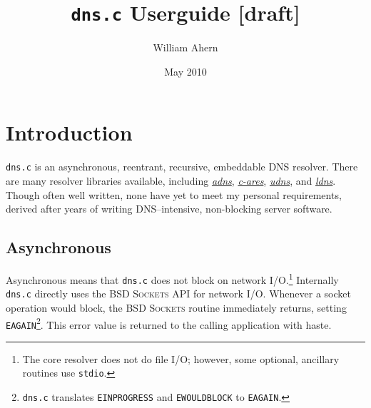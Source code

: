 \documentclass[11pt]{article}
\begin{document}
%
%
\newcommand*{\dnsc}[0]{\texttt{dns.c}\xspace}
\newcommand*{\lref}[1]{\hyperref[#1]{#1}\index{#1}}
\newcommand*{\dn}[1]{\texttt{#1}\xspace}

\newenvironment{todo}[1]{
	\begin{color}{red}
	\sf
	\begin{tabular}{|p{0.9\textwidth}|}
	\hline
	TODO---\uppercase{#1} \\\hline
	\index{TODO!\lowercase{#1}}
}{
	\\\hline
	\end{tabular}
	\end{color}
}

%
%
\title{\dnsc Userguide [draft]}
\date{May 2010}
\author{William Ahern}
\maketitle

\tableofcontents


\clearpage

\setcounter{page}{1}


\section{Introduction}

\dnsc is an asynchronous, reentrant, recursive, embeddable DNS resolver.
There are many resolver libraries available, including
\href{http://www.chiark.greenend.org.uk/~ian/adns/}{\textit{adns}},
\href{http://c-ares.haxx.se/}{\textit{c-ares}},
\href{http://www.corpit.ru/mjt/udns.html}{\textit{udns}}, and
\href{http://nlnetlabs.nl/projects/ldns/}{\textit{ldns}}. Though often well
written, none have yet to meet my personal requirements, derived after years
of writing DNS--intensive, non-blocking server software.

\subsection{Asynchronous}

Asynchronous means that \dnsc does not block on network I/O.\footnote{The
core resolver does not do file I/O; however, some optional, ancillary
routines use \texttt{stdio}.} Internally \dnsc directly uses the \textsc{BSD
Sockets} API for network I/O. Whenever a socket operation would block, the
\textsc{BSD Sockets} routine immediately returns, setting
\texttt{EAGAIN}\footnote{\dnsc translates \texttt{EINPROGRESS}
and \texttt{EWOULDBLOCK} to \texttt{EAGAIN}.}.
This error value is returned to the calling application with haste.
\end{document}
